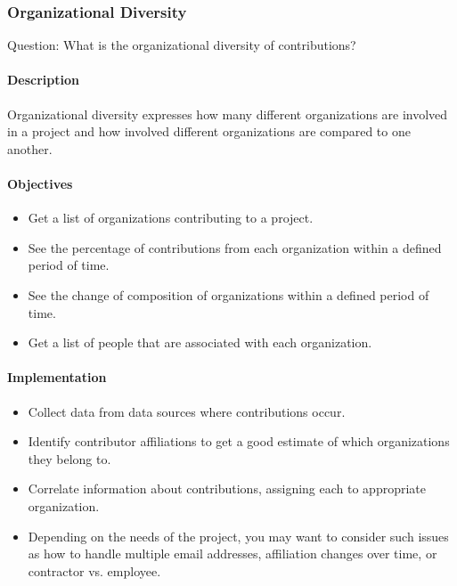 \hypertarget{organizational-diversity}{%
\subsubsection{Organizational
Diversity}\label{organizational-diversity}}

Question: What is the organizational diversity of contributions?

\hypertarget{description}{%
\paragraph{Description}\label{description}}

Organizational diversity expresses how many different organizations are
involved in a project and how involved different organizations are
compared to one another.

\hypertarget{objectives}{%
\paragraph{Objectives}\label{objectives}}

\begin{itemize}
\tightlist
\item
  Get a list of organizations contributing to a project.
\item
  See the percentage of contributions from each organization within a
  defined period of time.
\item
  See the change of composition of organizations within a defined period
  of time.
\item
  Get a list of people that are associated with each organization.
\end{itemize}

\hypertarget{implementation}{%
\paragraph{Implementation}\label{implementation}}

\begin{itemize}
\tightlist
\item
  Collect data from data sources where contributions occur.
\item
  Identify contributor affiliations to get a good estimate of which
  organizations they belong to.
\item
  Correlate information about contributions, assigning each to
  appropriate organization.
\item
  Depending on the needs of the project, you may want to consider such
  issues as how to handle multiple email addresses, affiliation changes
  over time, or contractor vs. employee.
\end{itemize}


